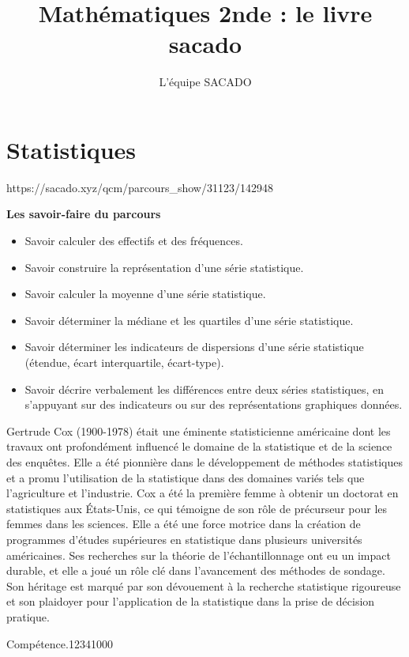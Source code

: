 



\title{Mathématiques 2nde  : le livre sacado}
\author{L'équipe SACADO}




\chapter{Statistiques}
{https://sacado.xyz/qcm/parcours_show/31123/142948}
{
 \begin{CpsCol}
	\textbf{Les savoir-faire du parcours}
 	\begin{itemize}
 		\item Savoir calculer des effectifs et des fréquences.
 		\item Savoir construire la représentation d'une série statistique.
 		\item Savoir calculer la moyenne d'une série statistique.
 		\item Savoir déterminer la médiane et les quartiles d'une série statistique.
 		\item Savoir déterminer les indicateurs de dispersions d'une série statistique (étendue, écart interquartile, écart-type).
 		\item Savoir décrire verbalement les différences entre deux séries statistiques, en s'appuyant sur des indicateurs ou sur des représentations graphiques données.
 	\end{itemize}
 \end{CpsCol}

\begin{His}
Gertrude Cox (1900-1978) était une éminente statisticienne américaine dont les travaux ont profondément influencé le domaine de la statistique et de la science des enquêtes. Elle a été pionnière dans le développement de méthodes statistiques et a promu l'utilisation de la statistique dans des domaines variés tels que l'agriculture et l'industrie. Cox a été la première femme à obtenir un doctorat en statistiques aux États-Unis, ce qui témoigne de son rôle de précurseur pour les femmes dans les sciences. Elle a été une force motrice dans la création de programmes d'études supérieures en statistique dans plusieurs universités américaines. Ses recherches sur la théorie de l'échantillonnage ont eu un impact durable, et elle a joué un rôle clé dans l'avancement des méthodes de sondage. Son héritage est marqué par son dévouement à la recherche statistique rigoureuse et son plaidoyer pour l'application de la statistique dans la prise de décision pratique.
\end{His}

\begin{ExoDec}{Compétence.}{1234}{1}{0}{0}{0}
\end{ExoDec}
}

